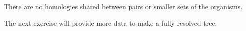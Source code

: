 \documentclass[12pt, hidelinks]{exam}
\newcommand*\AnswerBox[2]{%
    \parbox[t][#1]{0.92\textwidth}{%
    \begin{solution}#2\end{solution}}
    \vspace{\stretch{1}}
}
\begin{document}
\begin{questions}
%		
%



\AnswerBox{3\baselineskip}{There are no homologies shared between pairs or smaller sets of the organisms.}

\end{questions}

 The next exercise will provide more data to make a fully resolved tree.
\end{document}
